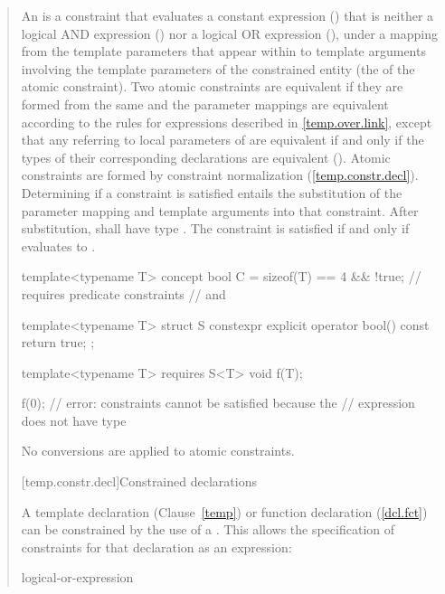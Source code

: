 \begin{quote}
\begin{addedblock}
\pnum
An  is a constraint that evaluates a constant 
expression  () that is neither a logical
AND expression () nor a logical OR expression
(), under a mapping from the template parameters
that appear within  to template arguments involving the
template parameters of the constrained entity (the  of the atomic constraint).
Two atomic constraints are equivalent if they are formed from the same
 and the parameter mappings are equivalent
according to the rules for expressions described in \ref{temp.over.link},
except that any  referring to 
local parameters of 
are equivalent if and only if the types of their corresponding
declarations are equivalent ().
% 
\enternote
Atomic constraints are formed by constraint normalization (\ref{temp.constr.decl}).
\exitnote
% 
Determining if a constraint is satisfied entails the substitution 
of the parameter mapping and template arguments into that constraint.
% 
After substitution,  shall have type .
% 
The constraint is satisfied if and only if  evaluates to 
.
% 
\enterexample
\begin{codeblock}
template<typename T> 
  concept bool C = sizeof(T) == 4 && !true; // requires predicate constraints
                                            //  and 

template<typename T>
  struct S {
    constexpr explicit operator bool() const { return true; }
  };

template<typename T>
  requires S<T>{}
    void f(T);

f(0); // error: constraints cannot be satisfied because the
      // expression  does not have type 
\end{codeblock}
No conversions are applied to atomic constraints.
\exitexample


[temp.constr.decl]{Constrained declarations}

\pnum
A template declaration (Clause~\ref{temp}) or function declaration 
(\ref{dcl.fct}) can be constrained by the use of a 
. 
% 
This allows the specification of constraints for that declaration as
an expression:

\begin{bnf}
\br
    logical-or-expression
\end{bnf}


\end{addedblock}
\end{quote}
